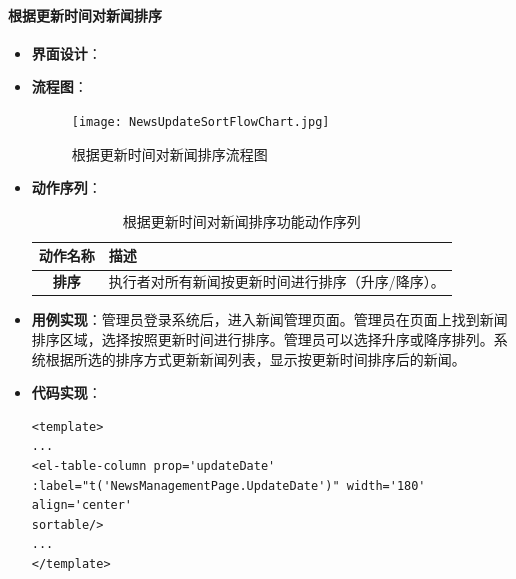 \paragraph{根据更新时间对新闻排序}
\begin{itemize}
	\item \textbf{界面设计}：
	\item \textbf{流程图}：
	\begin{figure}[H]
		\centering
		\texttt{[image: NewsUpdateSortFlowChart.jpg]}
		\caption{根据更新时间对新闻排序流程图}
		\label{NewsUpdateSortFlowChart}
	\end{figure}
	\item \textbf{动作序列}：
	\begin{table}[H]
		\centering
		\caption{根据更新时间对新闻排序功能动作序列}
		\renewcommand\arraystretch{1.5}
		\begin{tabular}{|c|>{\raggedright\arraybackslash}p{10cm}|}
			\hline
			\textbf{动作名称} & \textbf{描述} \\ \hline
			\textbf{排序} & 执行者对所有新闻按更新时间进行排序（升序/降序）。 \\ \hline
		\end{tabular}
	\end{table}
	\item \textbf{用例实现}：管理员登录系统后，进入新闻管理页面。管理员在页面上找到新闻排序区域，选择按照更新时间进行排序。管理员可以选择升序或降序排列。系统根据所选的排序方式更新新闻列表，显示按更新时间排序后的新闻。
	\item \textbf{代码实现}：
	\begin{verbatim}
<template>
...
<el-table-column prop='updateDate' :label="t('NewsManagementPage.UpdateDate')" width='180' align='center'
sortable/>
...
</template>
	\end{verbatim}
\end{itemize}

